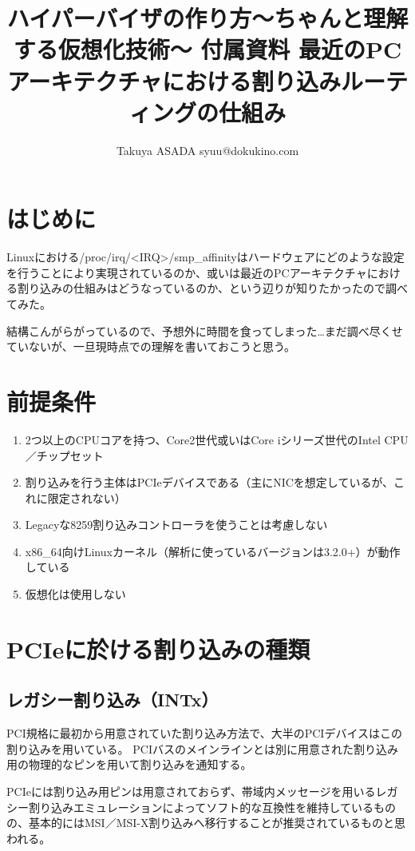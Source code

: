 
\title{ハイパーバイザの作り方～ちゃんと理解する仮想化技術～ 付属資料 最近のPCアーキテクチャにおける割り込みルーティングの仕組み}
 \author{Takuya ASADA syuu@dokukino.com}

\maketitle

\section{はじめに}
Linuxにおける/proc/irq/<IRQ>/smp\_affinityはハードウェアにどのような設定を行うことにより実現されているのか、或いは最近のPCアーキテクチャにおける割り込みの仕組みはどうなっているのか、という辺りが知りたかったので調べてみた。

結構こんがらがっているので、予想外に時間を食ってしまった…まだ調べ尽くせていないが、一旦現時点での理解を書いておこうと思う。

\section{前提条件}
\begin{enumerate}
\item 2つ以上のCPUコアを持つ、Core2世代或いはCore iシリーズ世代のIntel CPU／チップセット
\item 割り込みを行う主体はPCIeデバイスである（主にNICを想定しているが、これに限定されない）
\item Legacyな8259割り込みコントローラを使うことは考慮しない
\item x86\_64向けLinuxカーネル（解析に使っているバージョンは3.2.0+）が動作している
\item 仮想化は使用しない
\end{enumerate}

\section{PCIeに於ける割り込みの種類}
\subsection{レガシー割り込み（INTx）}
PCI規格に最初から用意されていた割り込み方法で、大半のPCIデバイスはこの割り込みを用いている。
PCIバスのメインラインとは別に用意された割り込み用の物理的なピンを用いて割り込みを通知する。

PCIeには割り込み用ピンは用意されておらず、帯域内メッセージを用いるレガシー割り込みエミュレーションによってソフト的な互換性を維持しているものの、基本的にはMSI／MSI-X割り込みへ移行することが推奨されているものと思われる。

